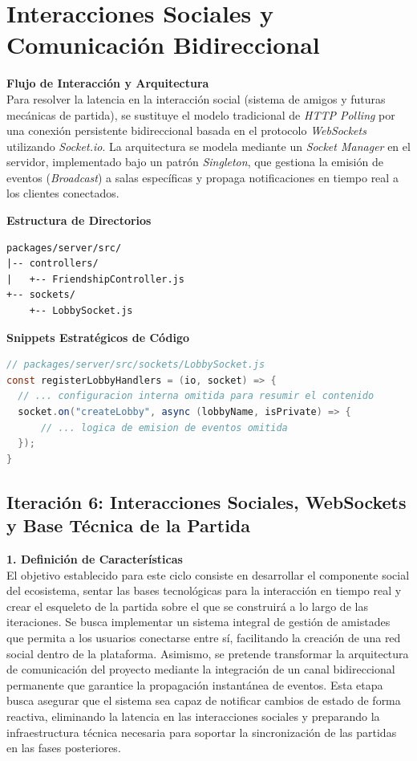 \section{Interacciones Sociales y Comunicación Bidireccional}

\textbf{Flujo de Interacción y Arquitectura} \\
Para resolver la latencia en la interacción social (sistema de amigos y futuras mecánicas de partida), se sustituye el modelo tradicional de \textit{HTTP Polling} por una conexión persistente bidireccional basada en el protocolo \textit{WebSockets} utilizando \textit{Socket.io}. La arquitectura se modela mediante un \textit{Socket Manager} en el servidor, implementado bajo un patrón \textit{Singleton}, que gestiona la emisión de eventos (\textit{Broadcast}) a salas específicas y propaga notificaciones en tiempo real a los clientes conectados.

\textbf{Estructura de Directorios} \\
\begin{verbatim}
packages/server/src/
|-- controllers/
|   +-- FriendshipController.js
+-- sockets/
    +-- LobbySocket.js
\end{verbatim}

\textbf{Snippets Estratégicos de Código} \\
\begin{lstlisting}[language=Java,breaklines=true]
// packages/server/src/sockets/LobbySocket.js
const registerLobbyHandlers = (io, socket) => {
  // ... configuracion interna omitida para resumir el contenido
  socket.on("createLobby", async (lobbyName, isPrivate) => {
      // ... logica de emision de eventos omitida
  });
}
\end{lstlisting}

\subsection{Iteración 6: Interacciones Sociales, WebSockets y Base Técnica de la Partida}

\textbf{1. Definición de Características} \\
El objetivo establecido para este ciclo consiste en desarrollar el componente social del ecosistema, sentar las bases tecnológicas para la interacción en tiempo real y crear el esqueleto de la partida sobre el que se construirá a lo largo de las iteraciones. Se busca implementar un sistema integral de gestión de amistades que permita a los usuarios conectarse entre sí, facilitando la creación de una red social dentro de la plataforma. Asimismo, se pretende transformar la arquitectura de comunicación del proyecto mediante la integración de un canal bidireccional permanente que garantice la propagación instantánea de eventos. Esta etapa busca asegurar que el sistema sea capaz de notificar cambios de estado de forma reactiva, eliminando la latencia en las interacciones sociales y preparando la infraestructura técnica necesaria para soportar la sincronización de las partidas en las fases posteriores.

